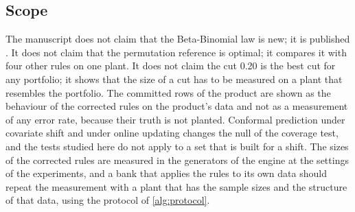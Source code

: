\subsection{Scope}

The manuscript does not claim that the Beta-Binomial law is new; it is published \citep{vovk2012,angelopoulos2021}. It does not claim that the permutation reference is optimal; it compares it with four other rules on one plant. It does not claim the cut 0.20 is the best cut for any portfolio; it shows that the size of a cut has to be measured on a plant that resembles the portfolio. The committed rows of the product are shown as the behaviour of the corrected rules on the product's data and not as a measurement of any error rate, because their truth is not planted. Conformal prediction under covariate shift and under online updating \citep{tibshirani2019,gibbs2021,barber2023} changes the null of the coverage test, and the tests studied here do not apply to a set that is built for a shift. The sizes of the corrected rules are measured in the generators of the engine at the settings of the experiments, and a bank that applies the rules to its own data should repeat the measurement with a plant that has the sample sizes and the structure of that data, using the protocol of \cref{alg:protocol}.
